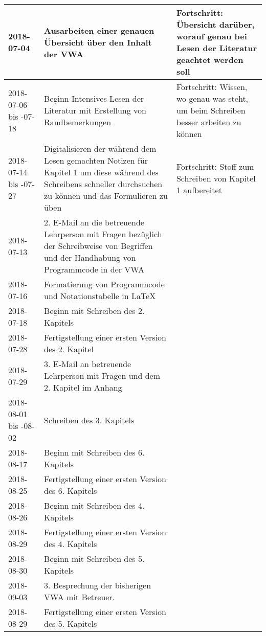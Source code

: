 \documentclass[a4paper,12pt,ngerman,oneside]{scrreprt}
\begin{document}
\begin{longtable}{|p{21mm}|p{71mm}|p{66mm}|}
		2018-07-04 & Ausarbeiten einer genauen Übersicht über den Inhalt der VWA & Fortschritt: Übersicht darüber, worauf genau bei Lesen der Literatur geachtet werden soll \\\hline
		2018-07-06 \newline bis \newline 2018-07-18& Beginn Intensives Lesen der Literatur mit Erstellung von Randbemerkungen & Fortschritt: Wissen, wo genau was steht, um beim Schreiben besser arbeiten zu können \\\hline
		2018-07-14 \newline bis \newline 2018-07-27& Digitalisieren der während dem Lesen gemachten Notizen für Kapitel 1 um diese während des Schreibens schneller durchsuchen zu können und das Formulieren zu üben & Fortschritt: Stoff zum Schreiben von Kapitel 1 aufbereitet \\\hline
		2018-07-13 & 2. E-Mail an die betreuende Lehrperson mit Fragen bezüglich der Schreibweise von Begriffen und der Handhabung von Programmcode in der VWA & \\\hline
		2018-07-16 & Formatierung von Programmcode und Notationstabelle in \LaTeX & \\\hline
		2018-07-18 & Beginn mit Schreiben des 2. Kapitels & \\\hline
		2018-07-28 & Fertigstellung einer ersten Version des 2. Kapitel & \\\hline
		2018-07-29 & 3. E-Mail an betreuende Lehrperson mit Fragen und dem 2. Kapitel im Anhang & \\\hline
		2018-08-01 \newline bis \newline 2018-08-02 & Schreiben des 3. Kapitels & \\\hline	
		2018-08-17 & Beginn mit Schreiben des 6. Kapitels & \\\hline
		2018-08-25 & Fertigstellung einer ersten Version des 6. Kapitels & \\\hline	
		2018-08-26 & Beginn mit Schreiben des 4. Kapitels & \\\hline
		2018-08-29 & Fertigstellung einer ersten Version des 4. Kapitels & \\\hline
		2018-08-30 & Beginn mit Schreiben des 5. Kapitels & \\\hline
		2018-09-03 & 3. Besprechung der bisherigen VWA  mit Betreuer. & \\\hline
		2018-08-29 & Fertigstellung einer ersten Version des 5. Kapitels & \\\hline

\end{longtable}
\end{document}

